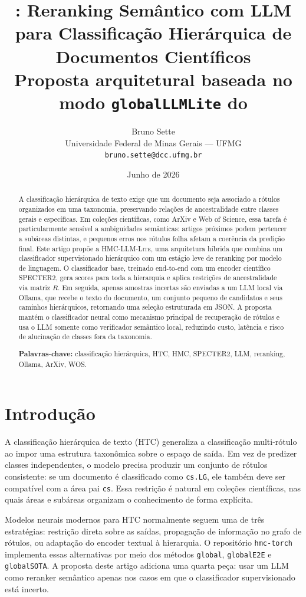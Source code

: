 \documentclass[11pt,a4paper]{article}
\title{
  {\LARGE \method: Reranking Semântico com LLM}\\[0.25em]
  {\LARGE para Classificação Hierárquica de Documentos Científicos}\\[0.5em]
  {\large Proposta arquitetural baseada no modo \texttt{globalLLMLite} do \repo}
}
\author{
  Bruno Sette\\[0.2em]
  \small Universidade Federal de Minas Gerais --- UFMG\\
  \small \texttt{bruno.sette@dcc.ufmg.br}
}
\date{\small Junho de 2026}
\newcommand{\method}{\textsc{HMC-LLM-Lite}}
\newcommand{\repo}{\texttt{hmc-torch}}
\begin{document}
\maketitle

\begin{abstract}
A classificação hierárquica de texto exige que um documento seja associado a
rótulos organizados em uma taxonomia, preservando relações de ancestralidade
entre classes gerais e específicas. Em coleções científicas, como ArXiv e Web of
Science, essa tarefa é particularmente sensível a ambiguidades semânticas:
artigos próximos podem pertencer a subáreas distintas, e pequenos erros nos
rótulos folha afetam a coerência da predição final. Este artigo propõe a
\method, uma arquitetura híbrida que combina um classificador supervisionado
hierárquico com um estágio leve de reranking por modelo de linguagem. O
classificador base, treinado end-to-end com um encoder científico
\textsc{SPECTER2}, gera scores para toda a hierarquia e aplica restrições de
ancestralidade via matriz $R$. Em seguida, apenas amostras incertas são enviadas
a um LLM local via Ollama, que recebe o texto do documento, um conjunto pequeno de
candidatos e seus caminhos hierárquicos, retornando uma seleção estruturada em
JSON. A proposta mantém o classificador neural como mecanismo principal de
recuperação de rótulos e usa o LLM somente como verificador semântico local,
reduzindo custo, latência e risco de alucinação de classes fora da taxonomia.

\vspace{0.5em}
\noindent\textbf{Palavras-chave:} classificação hierárquica, HTC, HMC,
SPECTER2, LLM, reranking, Ollama, ArXiv, WOS.
\end{abstract}

\section{Introdução}

A classificação hierárquica de texto (HTC) generaliza a classificação multi-rótulo
ao impor uma estrutura taxonômica sobre o espaço de saída. Em vez de predizer
classes independentes, o modelo precisa produzir um conjunto de rótulos
consistente: se um documento é classificado como \texttt{cs.LG}, ele também deve
ser compatível com a área pai \texttt{cs}. Essa restrição é natural em coleções
científicas, nas quais áreas e subáreas organizam o conhecimento de forma
explícita.

Modelos neurais modernos para HTC normalmente seguem uma de três estratégias:
restrição direta sobre as saídas, propagação de informação no grafo de rótulos,
ou adaptação do encoder textual à hierarquia. O repositório \repo{} implementa
essas alternativas por meio dos métodos \texttt{global}, \texttt{globalE2E} e
\texttt{globalSOTA}. A proposta deste artigo adiciona uma quarta peça: usar um
LLM como reranker semântico apenas nos casos em que o classificador supervisionado
está incerto.
\end{document}
